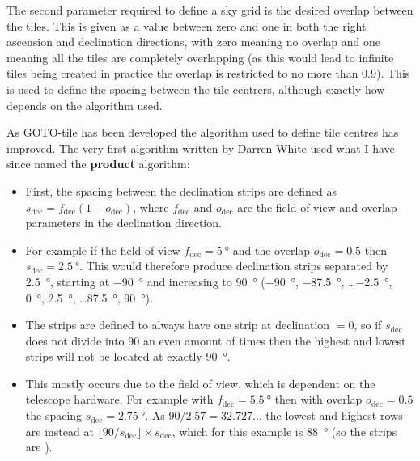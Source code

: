 \begin{colsection}
\begin{colsection}
The second parameter required to define a sky grid is the desired overlap between the tiles. This is given as a value between zero and one in both the right ascension and declination directions, with zero meaning no overlap and one meaning all the tiles are completely overlapping (as this would lead to infinite tiles being created in practice the overlap is restricted to no more than $0.9$). This is used to define the spacing between the tile centrers, although exactly how depends on the algorithm used.

As GOTO-tile has been developed the algorithm used to define tile centres has improved. The very first algorithm written by Darren White used what I have since named the \textbf{product} algorithm:
\begin{itemize}
    \item First, the spacing between the declination strips are defined as $s_{\mathrm{dec}} = f_{\mathrm{dec}} (1 - o_{\mathrm{dec}})$, where $f_{\mathrm{dec}}$ and $o_{\mathrm{dec}}$ are the field of view and overlap parameters in the declination direction.
    \item For example if the field of view $f_{\mathrm{dec}} = \SI{5}{\degree}$ and the overlap $o_{\mathrm{dec}} = 0.5$ then $s_{\mathrm{dec}} = \SI{2.5}{\degree}$. This would therefore produce declination strips separated by \SI{2.5}{\degree}, starting at \SI{-90}{\degree} and increasing to \SI{90}{\degree} (\SI{-90}{\degree}, \SI{-87.5}{\degree}, \dots \SI{-2.5}{\degree}, \SI{0}{\degree}, \SI{2.5}{\degree}, \dots \SI{87.5}{\degree}, \SI{90}{\degree}).
    \item The strips are defined to always have one strip at declination $=0$, so if $s_{\mathrm{dec}}$ does not divide into 90 an even amount of times then the highest and lowest strips will not be located at exactly \SI{90}{\degree}.
    \item This mostly occurs due to the field of view, which is dependent on the telescope hardware. For example with $f_{\mathrm{dec}} = \SI{5.5}{\degree}$ then with overlap $o_{\mathrm{dec}} = 0.5$ the spacing $s_{\mathrm{dec}} = \SI{2.75}{\degree}$. As $90/2.57 = 32.727\ldots$ the lowest and highest rows are instead at $\lfloor 90 / s_{\mathrm{dec}} \rfloor \times s_{\mathrm{dec}}$, which for this example is \SI{88}{\degree} (so the strips are ).


\end{itemize}






\end{colsection}
\end{colsection}
